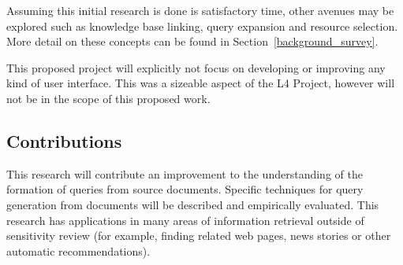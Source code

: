 \documentclass{mprop}
\begin{document}
Assuming this initial research is done is satisfactory time, other avenues may be explored such as knowledge base linking, query expansion and resource selection. 
More detail on these concepts can be found in Section~\ref{background_survey}.

This proposed project will explicitly not focus on developing or improving any kind of user interface. 
This was a sizeable aspect of the L4 Project, however will not be in the scope of this proposed work.



\subsection{Contributions}
This research will contribute an improvement to the understanding of the formation of queries from source documents. 
Specific techniques for query generation from documents will be described and empirically evaluated. 
This research has applications in many areas of information retrieval outside of sensitivity review (for example, finding related web pages, news stories or other automatic recommendations).
\end{document}
